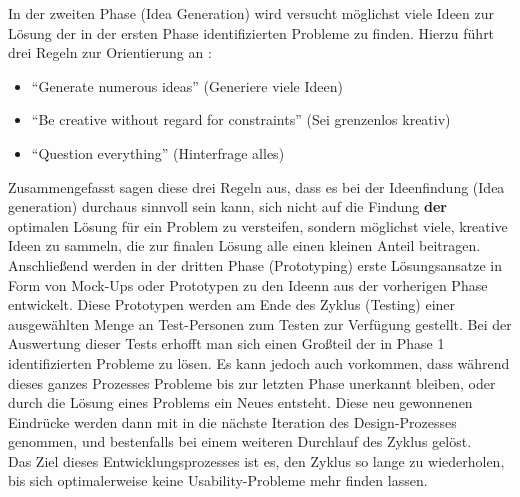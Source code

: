 In der zweiten Phase (Idea Generation) wird versucht möglichst viele Ideen zur Lösung der in der ersten Phase identifizierten Probleme zu finden.
Hierzu führt \citeauthor{Norman13} drei Regeln zur Orientierung an \citep[Seite 226]{Norman13}:

\begin{itemize}
  \item ``Generate numerous ideas'' (Generiere viele Ideen)
  \item ``Be creative without regard for constraints'' (Sei grenzenlos kreativ)
  \item ``Question everything'' (Hinterfrage alles)
\end{itemize}

\noindent
Zusammengefasst sagen diese drei Regeln aus, dass es bei der Ideenfindung (Idea generation) durchaus sinnvoll sein kann, sich nicht auf die Findung \textbf{der} optimalen Lösung für ein Problem zu versteifen, sondern möglichst viele, kreative Ideen zu sammeln, die zur finalen Lösung alle einen kleinen Anteil beitragen. \\

Anschließend werden in der dritten Phase (Prototyping) erste Lösungsansatze in Form von Mock-Ups oder Prototypen zu den Ideenn aus der vorherigen Phase entwickelt.
Diese Prototypen werden am Ende des Zyklus (Testing) einer ausgewählten Menge an Test-Personen zum Testen zur Verfügung gestellt. Bei der Auswertung dieser Tests erhofft man sich einen Großteil der in Phase 1 identifizierten Probleme zu lösen.
Es kann jedoch auch vorkommen, dass während dieses ganzes Prozesses Probleme bis zur letzten Phase unerkannt bleiben, oder durch die Lösung eines Problems ein Neues entsteht.
Diese neu gewonnenen Eindrücke werden dann mit in die nächste Iteration des Design-Prozesses genommen, und bestenfalls bei einem weiteren Durchlauf des Zyklus gelöst. \\

Das Ziel dieses Entwicklungsprozesses ist es, den Zyklus so lange zu wiederholen, bis sich optimalerweise keine Usability-Probleme mehr finden lassen. \\

